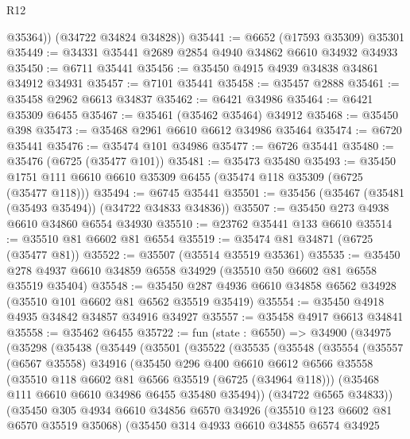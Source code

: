 \begin{lexlean}{R12}
\begin{coremodule}
          @35364))
      (@34722 @34824 @34828))
@35441 := @6652 (@17593 @35309) @35301
@35449 := @34331 @35441 @2689 @2854 @4940 @34862 @6610 @34932 @34933
@35450 := @6711 @35441
@35456 := @35450 @4915 @4939 @34838 @34861 @34912 @34931
@35457 := @7101 @35441
@35458 := @35457 @2888
@35461 := @35458 @2962 @6613 @34837
@35462 := @6421 @34986
@35464 := @6421 @35309 @6455
@35467 := @35461 (@35462 @35464) @34912
@35468 := @35450 @398
@35473 := @35468 @2961 @6610 @6612 @34986 @35464
@35474 := @6720 @35441
@35476 := @35474 @101 @34986
@35477 := @6726 @35441
@35480 := @35476 (@6725 (@35477 @101))
@35481 := @35473 @35480
@35493 := @35450 @1751 @111 @6610 @6610 @35309 @6455 (@35474 @118 @35309 (@6725 (@35477 @118)))
@35494 := @6745 @35441
@35501 := @35456 (@35467 (@35481 (@35493 @35494)) (@34722 @34833 @34836))
@35507 := @35450 @273 @4938 @6610 @34860 @6554 @34930
@35510 := @23762 @35441 @133 @6610
@35514 := @35510 @81 @6602 @81 @6554
@35519 := @35474 @81 @34871 (@6725 (@35477 @81))
@35522 := @35507 (@35514 @35519 @35361)
@35535 := @35450 @278 @4937 @6610 @34859 @6558 @34929 (@35510 @50 @6602 @81 @6558 @35519 @35404)
@35548 := @35450 @287 @4936 @6610 @34858 @6562 @34928 (@35510 @101 @6602 @81 @6562 @35519 @35419)
@35554 := @35450 @4918 @4935 @34842 @34857 @34916 @34927
@35557 := @35458 @4917 @6613 @34841
@35558 := @35462 @6455
@35722 := fun (state : @6550) =>
  @34900
    (@34975
      (@35298
        (@35438
          (@35449
            (@35501
              (@35522
                (@35535
                  (@35548
                    (@35554
                      (@35557
                        (@6567 @35558)
                        @34916
                        (@35450
                          @296
                          @400
                          @6610
                          @6612
                          @6566
                          @35558
                          (@35510 @118 @6602 @81 @6566 @35519 (@6725 (@34964 @118)))
                          (@35468 @111 @6610 @6610 @34986 @6455 @35480 @35494))
                        (@34722 @6565 @34833))
                      (@35450
                        @305
                        @4934
                        @6610
                        @34856
                        @6570
                        @34926
                        (@35510 @123 @6602 @81 @6570 @35519 @35068)
                        (@35450
                          @314
                          @4933
                          @6610
                          @34855
                          @6574
                          @34925

\end{coremodule}
\end{lexlean}
